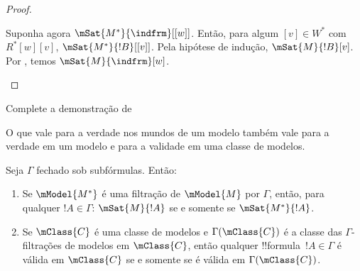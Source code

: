\documentclass[../../../include/open-logic-section]{subfiles}
\begin{document}
\begin{proof}
\begin{enumerate}
{{{          Suponha agora $\mSat{M^*}{\indfrm}[{[w]}]$. Então, para algum
          $[v] \in W^*$ com $R^*[w][v]$,
          $\mSat{M^*}{!B}[{[v]}]$. Pela hipótese de indução,
          $\mSat{M}{!B}[v]$. Por
          , temos
          $\mSat{M}{\indfrm}[w]$.}}}{}
  \end{enumerate}
\end{proof}

\begin{prob}
  Complete a demonstração de 
\end{prob}

O que vale para a verdade nos mundos de um modelo também vale para a
verdade em um modelo e para a validade em uma classe de modelos.

\begin{cor}
  Seja $\Gamma$ fechado sob subfórmulas. Então:
  \begin{enumerate}
  \item Se $\mModel{M^*}$ é uma filtração de $\mModel{M}$ por
    $\Gamma$, então, para qualquer $!A \in \Gamma$:
    $\mSat{M}{!A}$ se e somente se $\mSat{M^*}{!A}$.
  \item Se $\mClass{C}$ é uma classe de modelos e
    $\Gamma(\mClass{C})$ é a classe das $\Gamma$-filtrações de modelos
    em $\mClass{C}$, então qualquer !!{formula}~$!A \in \Gamma$ é
    válida em $\mClass{C}$ se e somente se é válida em
    $\Gamma(\mClass{C})$.
  \end{enumerate}
\end{cor}
\end{document}
